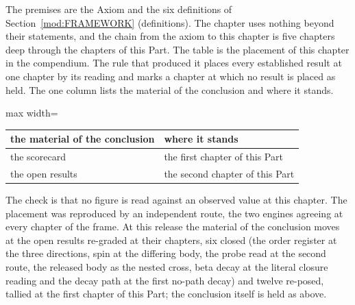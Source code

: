 \begin{chproof}[instrument]
The premises are the Axiom and the six definitions of Section~\ref{mod:FRAMEWORK} (definitions). The chapter uses nothing beyond their statements, and the chain from the axiom to this chapter is five chapters deep through the chapters of this Part.
The table is the placement of this chapter in the compendium. The rule that produced it places every established result at one chapter by its reading and marks a chapter at which no result is placed as held. The one column lists the material of the conclusion and where it stands.
\begin{center}
\begin{adjustbox}{max width=\linewidth}\begin{tabular}{ll}
\hline
the material of the conclusion & where it stands \\
\hline
the scorecard & the first chapter of this Part \\
the open results & the second chapter of this Part \\
\hline
\end{tabular}\end{adjustbox}
\end{center}
The check is that no figure is read against an observed value at this chapter.
The placement was reproduced by an independent route, the two engines agreeing at every chapter of the frame. At this release the material of the conclusion moves at the open results re-graded at their chapters, six closed (the order register at the three directions, spin at the differing body, the probe read at the second route, the released body as the nested cross, beta decay at the literal closure reading and the decay path at the first no-path decay) and twelve re-posed, tallied at the first chapter of this Part; the conclusion itself is held as above.
\end{chproof}
\par\medskip{}\label{narr:close:14-C}\par
